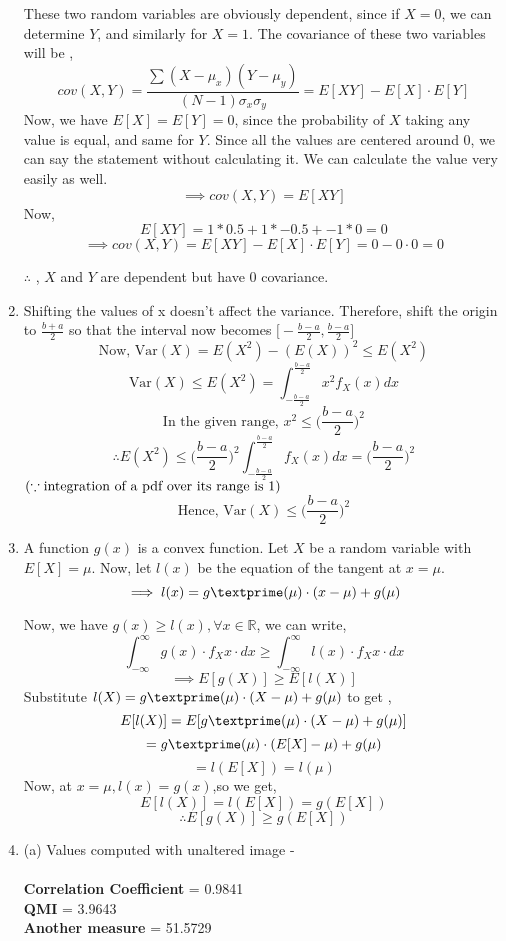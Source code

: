 \documentclass[11pt]{article}
\begin{document}
\begin{enumerate}
{		These two random variables are obviously dependent, since if $X=0$, we can determine $Y$, and similarly for $X=1$.
		The covariance of these two variables will be ,
		$$cov(X,Y) = \frac{ \sum{(X-\mu_x)(Y-\mu_y)}}{(N-1)\sigma_x\sigma_y} = E[XY]-E[X]\cdot E[Y] $$
		Now, we have $E[X] = E[Y] = 0$, since the probability of $X$ taking any value is equal, and same for $Y$. Since all the values are centered around 0, we can say the statement without calculating it. We can calculate the value very easily as well. 
		$$\implies cov(X,Y) = E[XY] $$
		Now,
		$$ E[XY] = 1*0.5 + 1*-0.5 + -1*0  = 0 $$
		$$ \implies cov(X,Y) = E[XY] - E[X]\cdot E[Y] = 0-0\cdot0 = 0$$
		\begin{center}
			$\therefore$ , $X$ and $Y$ are dependent but have 0 covariance.
		\end{center}
	}

	\item{
		Shifting the values of x doesn't affect the variance. Therefore, shift the origin to $\frac{b+a}{2}$ so that the interval now becomes $\Big[-\frac{b-a}{2},\frac{b-a}{2}\Big]$\\
        $$\text{Now, Var}(X) = E(X^2) - (E(X))^2 \leq E(X^2)$$
        $$\text{Var}(X) \leq E(X^2) = \int_{-\frac{b-a}{2}}^{\frac{b-a}{2}}x^2f_X(x)dx$$
        $$\text{In the given range,  } x^2 \leq \bigg(\frac{b-a}{2}\bigg)^2$$
        $$\therefore E(X^2) \leq \bigg(\frac{b-a}{2}\bigg)^2\int_{-\frac{b-a}{2}}^{\frac{b-a}{2}}f_X(x)dx = \bigg(\frac{b-a}{2}\bigg)^2$$ $\hfill{(\because \text{integration of a pdf over its range is 1})}$
        $$\text{Hence, Var}(X) \leq \bigg(\frac{b-a}{2}\bigg)^2$$
	}

	\item{
		A function $g(x)$ is a convex function.
		Let $X$ be a random variable with $E[X]=\mu$. 
		Now, let $l(x)$ be the equation of the tangent at $x=\mu$.
		$$\implies l(x) = g\textprime(\mu)\cdot(x-\mu) + g(\mu)$$

		Now, we have $g(x) \geq l(x) ,\forall x \in \mathbb{R} $, we can write, 
		$$\int_{-\infty}^{\infty}{g(x)\cdot f_X{x}\cdot dx} \geq \int_{-\infty}^{\infty}{l(x)\cdot f_X{x}\cdot dx} $$
		$$\implies E[g(X)] \geq E[l(X)]$$
		Substitute $l(X) = g\textprime(\mu)\cdot(X-\mu) + g(\mu)$ to get ,
		$$E[l(X)] = E[g\textprime(\mu)\cdot(X-\mu) + g(\mu)]$$
		$$ = g\textprime(\mu)\cdot(E[X]-\mu) + g(\mu)$$
		$$ = l(E[X]) = l(\mu)$$
		Now, at $x=\mu, l(x) = g(x)$,so we get,
		$$E[l(X)] = l(E[X]) = g(E[X]) $$
		$$ \therefore E[g(X)] \geq g(E[X]) $$
	}

	\item{
		(a) Values computed with unaltered image - \\ \\
		\textbf{Correlation Coefficient} = 0.9841 \\
		\textbf{QMI} = 3.9643 \\
		\textbf{Another measure} = 51.5729

}
\end{enumerate}
\end{document}
